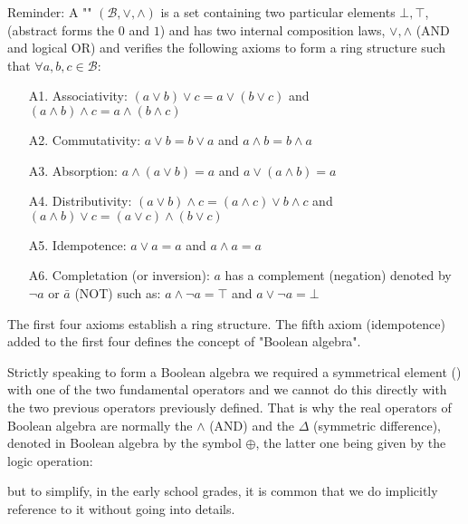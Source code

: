 	Reminder: A "" $(\mathcal{B},\vee,\wedge)$ is a set containing two particular elements $\bot,\top$, (abstract forms the $0$ and $1$) and has two internal composition laws, $\vee,\wedge$ (AND and logical OR) and verifies the following axioms to form a ring structure such that $\forall a,b,c\in \mathcal{B}$:
	
	\begin{itemize}
		\item[A1.] Associativity: $(a \vee b)\vee c=a \vee (b \vee c)$ and $(a \wedge b)\wedge c=a \wedge (b\wedge c)$
		
		\item[A2.] Commutativity: $a \vee b=b \vee a$ and $a \wedge b=b\wedge a$
		
		\item[A3.] Absorption: $a \wedge (a \vee b)=a$ and $a \vee (a \wedge b)=a$
		
		\item[A4.] Distributivity: $(a \vee b)\wedge c=(a \wedge c)\vee b \wedge c$ and $(a\wedge b)\vee c=(a \vee c)\wedge(b\vee c)$
		
		\item[A5.] Idempotence: $a \vee a=a$ and $a\wedge a=a$
		
		\item[A6.] Completation (or inversion): $a$ has a complement (negation) denoted by $\neg a$ or $\bar{a}$ (NOT) such as: $a \wedge \neg a=\top$ and $a \vee \neg a=\bot$
	\end{itemize}
	\begin{tcolorbox}[title=Remark,colframe=black,arc=10pt]
	The first four axioms establish a ring structure. The fifth axiom (idempotence) added to the first four defines the concept of "Boolean algebra".
	\end{tcolorbox}
	Strictly speaking to form a Boolean algebra we required a symmetrical element () with one of the two fundamental operators and we cannot do this directly with the two previous operators previously defined. That is why the real operators of Boolean algebra are normally the $\wedge$ (AND) and the $\Delta$ (symmetric difference), denoted in Boolean algebra by the symbol $\oplus$, the latter one being given by the logic operation:
	
	but to simplify, in the early school grades, it is common that we do implicitly reference to it without going into details.
	
